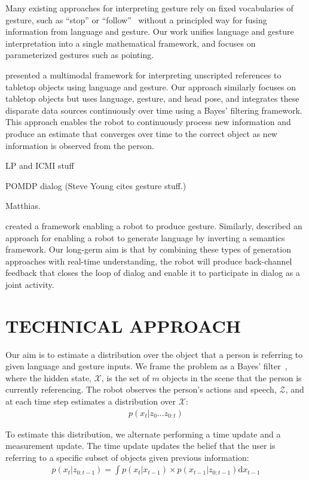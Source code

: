 \documentclass[letterpaper, 10 pt, conference]{ieeeconf}
\begin{document}
Many existing approaches for interpreting gesture rely on fixed
vocabularies of gesture, such as ``stop'' or
``follow''~\citep{waldherr00, marge11} without a principled way for
fusing information from language and gesture.  Our work unifies
language and gesture interpretation into a single mathematical
framework, and focuses on parameterized gestures such as pointing.




\citet{matuszek14} presented a multimodal framework for interpreting
unscripted references to tabletop objects using language and gesture.
Our approach similarly focuses on tabletop objects but uses language,
gesture, and head pose, and integrates these disparate data sources
continuously over time using a Bayes' filtering framework.  This
approach enables the robot to continuously process new information and
produce an estimate that converges over time to the correct object as
new information is observed from the person.  

LP and ICMI stuff

POMDP dialog (Steve Young cites gesture stuff.)

Matthias. 

\citet{dragan13} created a framework enabling a robot to produce
gesture.  Similarly, \citet{tellex14} described an approach for
enabling a robot to generate language by inverting a semantics
framework.  Our long-germ aim is that by combining these types of
generation approaches with real-time understanding, the robot will
produce back-channel feedback that closes the loop of dialog and
enable it to participate in dialog as a joint activity.

\section{TECHNICAL APPROACH}

Our aim is to estimate a distribution over the object that a person is
referring to given language and gesture inputs.  We frame the problem
as a Bayes' filter~\citep{thrun08}, where the hidden state,
$\mathcal{X}$, is the set of $m$ objects in the scene that the person
is currently referencing. The robot observes the person's actions and
speech, $\mathcal{Z}$, and at each time step estimates a distribution
over $\mathcal{X}$:
\begin{align}
  p(x_t | z_0 \dots z_{0:t})
\end{align}


To estimate this distribution, we alternate performing a time update
and a measurement update.  The time update updates the belief that the
user is referring to a specific subset of objects given previous
information:
\begin{align}
p(x_t | z_{0:t-1}) = \int p(x_t|x_{t-1})\times p(x_{t-1} | z_{0:t-1}) \text{d}x_{t-1}
\end{align}
\end{document}
